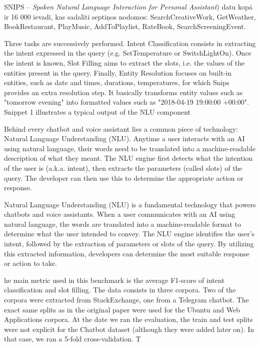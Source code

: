 SNIPS -- \textit{Spoken Natural Language Interaction for Personal Assistant}) datu kopā ir 16 000 ievadi, kas sadalīti septiņos nodomos: SearchCreativeWork, GetWeather, BookRestaurant, PlayMusic, AddToPlaylist, RateBook, SearchScreeningEvent.








Three tasks are successively performed. Intent Classification consists in extracting the intent expressed in the query (e.g. SetTemperature or SwitchLightOn). Once the intent is known, Slot Filling aims to extract the slots, i.e. the values of the entities present in the query. Finally, Entity Resolution focuses on built-in entities, such as date and times, durations, temperatures, for which Snips provides an extra resolution step. It basically transforms entity values such as "tomorrow evening" into formatted values such as "2018-04-19 19:00:00 +00:00". Snippet 1 illustrates a typical output of the NLU component



Behind every chatbot and voice assistant lies a common piece of technology: Natural Language Understanding (NLU). Anytime a user interacts with an AI using natural language, their words need to be translated into a machine-readable description of what they meant. The NLU engine first detects what the intention of the user is (a.k.a. intent), then extracts the parameters (called slots) of the query. The developer can then use this to determine the appropriate action or response.


Natural Language Understanding (NLU) is a fundamental technology that powers chatbots and voice assistants. When a user communicates with an AI using natural language, the words are translated into a machine-readable format to determine what the user intended to convey. The NLU engine identifies the user's intent, followed by the extraction of parameters or slots of the query. By utilizing this extracted information, developers can determine the most suitable response or action to take.


he main metric used in this benchmark is the average F1-score of intent classification
and slot filling. The data consists in three corpora. Two of the corpora were extracted from
StackExchange, one from a Telegram chatbot. The exact same splits as in the original paper were
used for the Ubuntu and Web Applications corpora. At the date we ran the evaluation, the train and
test splits were not explicit for the Chatbot dataset (although they were added later on). In that case,
we ran a 5-fold cross-validation. T


